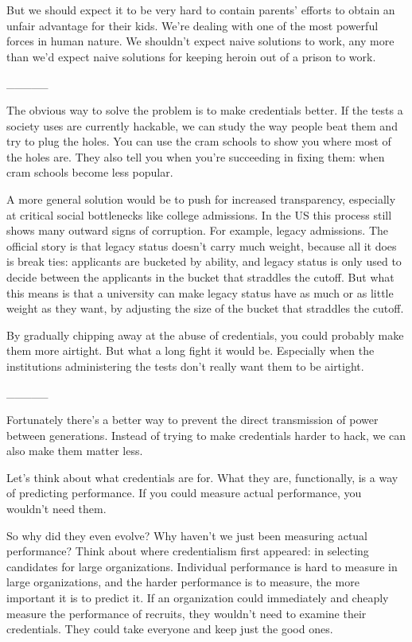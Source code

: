But we should expect it to be very hard to contain parents' efforts to
obtain an unfair advantage for their kids. We're dealing with one of the
most powerful forces in human nature. We shouldn't expect naive
solutions to work, any more than we'd expect naive solutions for keeping
heroin out of a prison to work.

\_\_\_\_\_

The obvious way to solve the problem is to make credentials better. If
the tests a society uses are currently hackable, we can study the way
people beat them and try to plug the holes. You can use the cram schools
to show you where most of the holes are. They also tell you when you're
succeeding in fixing them: when cram schools become less popular.

A more general solution would be to push for increased transparency,
especially at critical social bottlenecks like college admissions. In
the US this process still shows many outward signs of corruption. For
example, legacy admissions. The official story is that legacy status
doesn't carry much weight, because all it does is break ties: applicants
are bucketed by ability, and legacy status is only used to decide
between the applicants in the bucket that straddles the cutoff. But what
this means is that a university can make legacy status have as much or
as little weight as they want, by adjusting the size of the bucket that
straddles the cutoff.

By gradually chipping away at the abuse of credentials, you could
probably make them more airtight. But what a long fight it would be.
Especially when the institutions administering the tests don't really
want them to be airtight.

\_\_\_\_\_

Fortunately there's a better way to prevent the direct transmission of
power between generations. Instead of trying to make credentials harder
to hack, we can also make them matter less.

Let's think about what credentials are for. What they are, functionally,
is a way of predicting performance. If you could measure actual
performance, you wouldn't need them.

So why did they even evolve? Why haven't we just been measuring actual
performance? Think about where credentialism first appeared: in
selecting candidates for large organizations. Individual performance is
hard to measure in large organizations, and the harder performance is to
measure, the more important it is to predict it. If an organization
could immediately and cheaply measure the performance of recruits, they
wouldn't need to examine their credentials. They could take everyone and
keep just the good ones.

